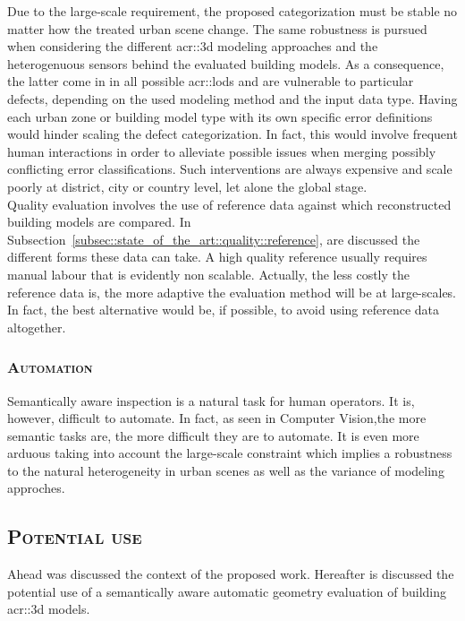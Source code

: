             Due to the large-scale requirement, the proposed categorization must be stable no matter how the treated urban scene change.
            The same robustness is pursued when considering the different \gls{acr::3d} modeling approaches and the heterogenuous sensors behind the evaluated building models.
            As a consequence, the latter come in in all possible \glspl{acr::lod} and are vulnerable to particular defects, depending on the used modeling method and the input data type.
            Having each urban zone or building model type with its own specific error definitions would hinder scaling the defect categorization.
            In fact, this would involve frequent human interactions in order to alleviate possible issues when merging possibly conflicting error classifications.
            Such interventions are always expensive and scale poorly at district, city or country level, let alone the global stage.\\

            Quality evaluation involves the use of reference data against which reconstructed building models are compared.
            In Subsection~\ref{subsec::state_of_the_art::quality::reference}, are discussed the different forms these data can take.
            A high quality reference usually requires manual labour that is evidently non scalable.
            Actually, the less costly the reference data is, the more adaptive the evaluation method will be at large-scales.
            In fact, the best alternative would be, if possible, to avoid using reference data altogether.

        \subsubsection{\textsc{Automation}}
            Semantically aware inspection is a natural task for human operators.
            It is, however, difficult to automate.
            In fact, as seen in Computer Vision,\addref the more semantic tasks are, the more difficult they are to automate.
            It is even more arduous taking into account the large-scale constraint which implies a robustness to the natural heterogeneity in urban scenes as well as the variance of modeling approches.

    \subsection{\textsc{Potential use}}
        \label{subsec::introduction::contributions::use}
        Ahead was discussed the context of the proposed work.
        Hereafter is discussed the potential use of a semantically aware automatic geometry evaluation of building \gls{acr::3d} models.
